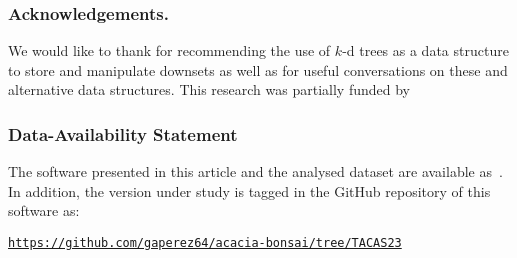 \documentclass[runningheads,a4paper]{llncs}
\begin{document}
\subsubsection*{Acknowledgements.}
We would like to thank  for recommending the use of
\(k\)-d trees as a data structure to store and manipulate downsets as well as
 for useful conversations on these and alternative data
structures.  This research was partially funded by 

\subsubsection*{Data-Availability Statement}
The software presented in this article and the analysed dataset are available
as~\cite{zenodo}.  In addition, the version under study is tagged in the GitHub
repository of this software as:\\
\centerline{\texttt{\url{https://github.com/gaperez64/acacia-bonsai/tree/TACAS23}}}



\end{document}
